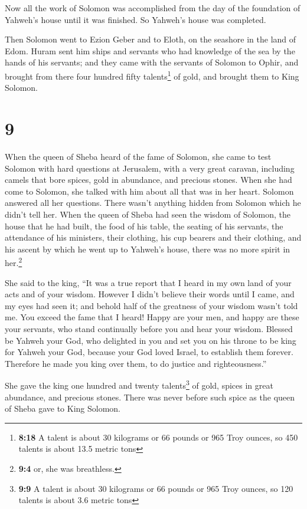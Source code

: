  Now all the work of Solomon was accomplished from the
day of the foundation of Yahweh's house until it was finished. So
Yahweh's house was completed.

 Then Solomon went to Ezion Geber and to Eloth, on the
seashore in the land of Edom.  Huram sent him ships and
servants who had knowledge of the sea by the hands of his servants; and
they came with the servants of Solomon to Ophir, and brought from there
four hundred fifty talents\footnote{\textbf{8:18} A talent is about 30
  kilograms or 66 pounds or 965 Troy ounces, so 450 talents is about
  13.5 metric tons} of gold, and brought them to King Solomon.

\hypertarget{section-8}{%
\section{9}\label{section-8}}

 When the queen of Sheba heard of the fame of Solomon, she
came to test Solomon with hard questions at Jerusalem, with a very great
caravan, including camels that bore spices, gold in abundance, and
precious stones. When she had come to Solomon, she talked with him about
all that was in her heart.  Solomon answered all her
questions. There wasn't anything hidden from Solomon which he didn't
tell her.  When the queen of Sheba had seen the wisdom of
Solomon, the house that he had built,  the food of his
table, the seating of his servants, the attendance of his ministers,
their clothing, his cup bearers and their clothing, and his ascent by
which he went up to Yahweh's house, there was no more spirit in
her.\footnote{\textbf{9:4} or, she was breathless.}

 She said to the king, ``It was a true report that I heard
in my own land of your acts and of your wisdom.  However I
didn't believe their words until I came, and my eyes had seen it; and
behold half of the greatness of your wisdom wasn't told me. You exceed
the fame that I heard!  Happy are your men, and happy are
these your servants, who stand continually before you and hear your
wisdom.  Blessed be Yahweh your God, who delighted in you
and set you on his throne to be king for Yahweh your God, because your
God loved Israel, to establish them forever. Therefore he made you king
over them, to do justice and righteousness.''

 She gave the king one hundred and twenty
talents\footnote{\textbf{9:9} A talent is about 30 kilograms or 66
  pounds or 965 Troy ounces, so 120 talents is about 3.6 metric tons} of
gold, spices in great abundance, and precious stones. There was never
before such spice as the queen of Sheba gave to King Solomon.

